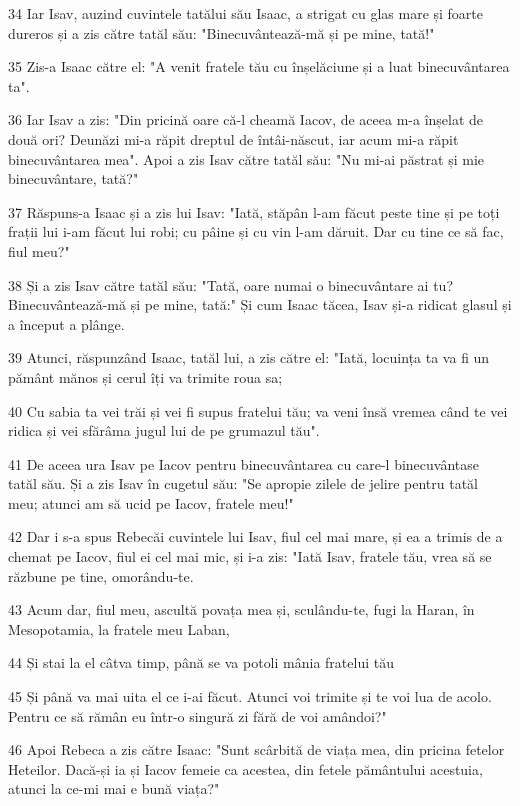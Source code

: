 \par 34 Iar Isav, auzind cuvintele tatălui său Isaac, a strigat cu glas mare și foarte dureros și a zis către tatăl său: "Binecuvântează-mă și pe mine, tată!"
\par 35 Zis-a Isaac către el: "A venit fratele tău cu înșelăciune și a luat binecuvântarea ta".
\par 36 Iar Isav a zis: "Din pricină oare că-l cheamă Iacov, de aceea m-a înșelat de două ori? Deunăzi mi-a răpit dreptul de întâi-născut, iar acum mi-a răpit binecuvântarea mea". Apoi a zis Isav către tatăl său: "Nu mi-ai păstrat și mie binecuvântare, tată?"
\par 37 Răspuns-a Isaac și a zis lui Isav: "Iată, stăpân l-am făcut peste tine și pe toți frații lui i-am făcut lui robi; cu pâine și cu vin l-am dăruit. Dar cu tine ce să fac, fiul meu?"
\par 38 Și a zis Isav către tatăl său: "Tată, oare numai o binecuvântare ai tu? Binecuvântează-mă și pe mine, tată:" Și cum Isaac tăcea, Isav și-a ridicat glasul și a început a plânge.
\par 39 Atunci, răspunzând Isaac, tatăl lui, a zis către el: "Iată, locuința ta va fi un pământ mănos și cerul îți va trimite roua sa;
\par 40 Cu sabia ta vei trăi și vei fi supus fratelui tău; va veni însă vremea când te vei ridica și vei sfărâma jugul lui de pe grumazul tău".
\par 41 De aceea ura Isav pe Iacov pentru binecuvântarea cu care-l binecuvântase tatăl său. Și a zis Isav în cugetul său: "Se apropie zilele de jelire pentru tatăl meu; atunci am să ucid pe Iacov, fratele meu!"
\par 42 Dar i s-a spus Rebecăi cuvintele lui Isav, fiul cel mai mare, și ea a trimis de a chemat pe Iacov, fiul ei cel mai mic, și i-a zis: "Iată Isav, fratele tău, vrea să se răzbune pe tine, omorându-te.
\par 43 Acum dar, fiul meu, ascultă povața mea și, sculându-te, fugi la Haran, în Mesopotamia, la fratele meu Laban,
\par 44 Și stai la el câtva timp, până se va potoli mânia fratelui tău
\par 45 Și până va mai uita el ce i-ai făcut. Atunci voi trimite și te voi lua de acolo. Pentru ce să rămân eu într-o singură zi fără de voi amândoi?"
\par 46 Apoi Rebeca a zis către Isaac: "Sunt scârbită de viața mea, din pricina fetelor Heteilor. Dacă-și ia și Iacov femeie ca acestea, din fetele pământului acestuia, atunci la ce-mi mai e bună viața?"

